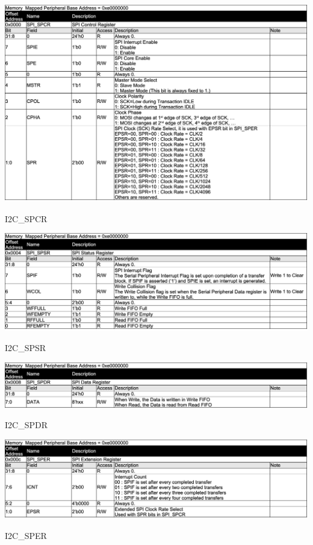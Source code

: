 \begin{table}[H]
    \includegraphics[width=1.0\columnwidth]{./Table/REG_SPI_SPCR.png}
    \caption{I2C\_SPCR}
    \label{tb:REG_I2C_SPCR}
\end{table}
\begin{table}[H]
    \includegraphics[width=1.0\columnwidth]{./Table/REG_SPI_SPSR.png}
    \caption{I2C\_SPSR}
    \label{tb:REG_I2C_SPSR}
\end{table}
\begin{table}[H]
    \includegraphics[width=1.0\columnwidth]{./Table/REG_SPI_SPDR.png}
    \caption{I2C\_SPDR}
    \label{tb:REG_I2C_SPDR}
\end{table}
\begin{table}[H]
    \includegraphics[width=1.0\columnwidth]{./Table/REG_SPI_SPER.png}
    \caption{I2C\_SPER}
    \label{tb:REG_I2C_SPER}
\end{table}
